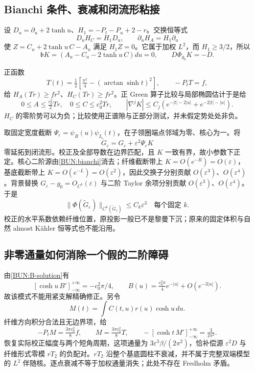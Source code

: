 \documentclass[UTF8,fontset=fandol,zihao=-4,oneside,openany]{ctexbook}
\theoremstyle{cjkplain}
\numberwithin{equation}{chapter}
\begin{document}
\subsection{Bianchi 条件、衰减和闭流形粘接}
设 $D_u=\partial_u+2\tanh u$、$H_1=-P_t-P_u+2-r$。交换恒等式
\[
 D_uH_C=H_1D_u,\qquad \partial_uH_A=H_1\partial_u
\]
使 $Z=C_u+2\tanh u\,C-A_u$ 满足 $H_1Z=0$。它属于加权 $L^2$，而 $H_1\ge3/2$，所以
\begin{equation}
 \mathfrak bK=(A_u-C_u-2\tanh u\,C)du=0,
 \qquad D\Phi_{g_0}K=-D.
 \label{BUN:bianchi}
\end{equation}

正函数
\[
 T(t)=\tfrac12\left[\tfrac{\pi^2}{4}-(\arctan\sinh t)^2\right],
 \qquad -P_tT=f,
\]
给 $H_A(Tr)\ge fr^2$、$H_C(Tr)\ge fr^2$。正 Green 算子比较与局部椭圆估计于是给
\begin{equation}
 0\le A\le\tfrac{c_0^2}{2}Tr,\quad 0\le C\le c_0^2Tr,
 \qquad |\nabla^jK|\le C_j(e^{-|t|-2|u|}+e^{-2|t|-|u|}).
 \label{BUN:decay}
\end{equation}
$H_C$ 的零阶势可以为负；比较使用正谱隙与正部分测试，并未假定势处处非负。

取固定宽度截断 $\Psi_\varepsilon=\psi_R(u)\psi_L(t)$，在子领圈端点邻域为零、核心为一。将
\begin{equation}
 \widetilde G_\varepsilon=G_\varepsilon+\varepsilon^2\Psi_\varepsilon K
 \label{BUN:corrected}
\end{equation}
零延拓到闭流形。校正及全部导数在边界匹配，且 $K$ 一致有界，故小参数下正定。核心二阶源由\eqref{BUN:bianchi}消去；纤维截断带上 $K=O(e^{-R})=O(\varepsilon)$，基底截断带上 $K=O(e^{-L})=O(\varepsilon^2)$，因此交换子分别贡献 $O(\varepsilon^3)$、$O(\varepsilon^4)$。背景替换 $G_\varepsilon-g_0=O_{C^k}(\varepsilon)$ 与二阶 Taylor 余项分别贡献 $O(\varepsilon^3)$、$O(\varepsilon^4)$。于是
\begin{equation}
 \boxed{\|\Phi(\widetilde G_\varepsilon)\|_{C^k(\widetilde G_\varepsilon)}
 \le C_k\varepsilon^3\quad\text{每个固定 }k.}
 \label{BUN:third-bound}
\end{equation}
校正的水平系数依赖纤维位置，原投影一般已不是黎曼下沉；原来的固定体积与自然 almost Kähler 恒等式也不能沿用。

\subsection{非零通量如何消除一个假的二阶障碍}
由\eqref{BUN:B-solution}有
\[
 [\cosh u\,B']_{-\infty}^{+\infty}=-c_0^2\pi/4,
 \qquad B(u)=\tfrac{c_0^2\pi}{4}e^{-|u|}+O(e^{-3|u|}).
\]
故该模式不能用紧支解精确修正。另令
\[
 M(t)=\int C(t,u)r(u)\cosh u\,du.
\]
纤维方向积分合法且无边界项，给
\[
 -P_tM=\tfrac{3\pi c_0^2}{8}f,\qquad
 M=\tfrac{3\pi c_0^2}{8}T,
 \qquad -[\cosh t\,M']_{-\infty}^{+\infty}=\tfrac{3}{2\pi^2}.
\]
恢复实际校正幅度与两个短角周期，这项通量为 $3\varepsilon^3\beta/(2\pi^2)$，恰补偿源 $\varepsilon^2D$ 与纤维形式零模 $rT_2$ 的负配对。$rT_2$ 沿整个基底圆柱不衰减，并不属于完整双端模型的 $L^2$ 伴随核。逐点衰减不等于加权通量消失；此处不存在 Fredholm 矛盾。
\end{document}
